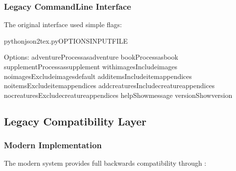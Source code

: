 \documentclass[letterpaper,10pt,english]{sphinxmanual}
\begin{document}
\subsubsection{Legacy Command\sphinxhyphen{}Line Interface}
\label{\detokenize{developer/legacy:legacy-command-line-interface}}
\sphinxAtStartPar
The original interface used simple flags:

\begin{sphinxVerbatim}[commandchars=\\\{\}]
pythonjson2tex.py\PYG{o}{[}OPTIONS\PYG{o}{]}INPUT\PYGZus{}FILE

Options:
\PYGZhy{}\PYGZhy{}adventureProcessasadventure
\PYGZhy{}\PYGZhy{}bookProcessasbook
\PYGZhy{}\PYGZhy{}supplementProcessassupplement
\PYGZhy{}\PYGZhy{}with\PYGZhy{}imagesIncludeimages
\PYGZhy{}\PYGZhy{}no\PYGZhy{}imagesExcludeimagesdefault
\PYGZhy{}\PYGZhy{}add\PYGZhy{}itemsIncludeitemappendices
\PYGZhy{}\PYGZhy{}no\PYGZhy{}itemsExcludeitemappendices
\PYGZhy{}\PYGZhy{}add\PYGZhy{}creaturesIncludecreatureappendices
\PYGZhy{}\PYGZhy{}no\PYGZhy{}creaturesExcludecreatureappendices
\PYGZhy{}\PYGZhy{}helpShowmessage
\PYGZhy{}\PYGZhy{}versionShowversion
\end{sphinxVerbatim}


\subsection{Legacy Compatibility Layer}
\label{\detokenize{developer/legacy:legacy-compatibility-layer}}

\subsubsection{Modern Implementation}
\label{\detokenize{developer/legacy:modern-implementation}}
\sphinxAtStartPar
The modern system provides full backwards compatibility through :
\end{document}
